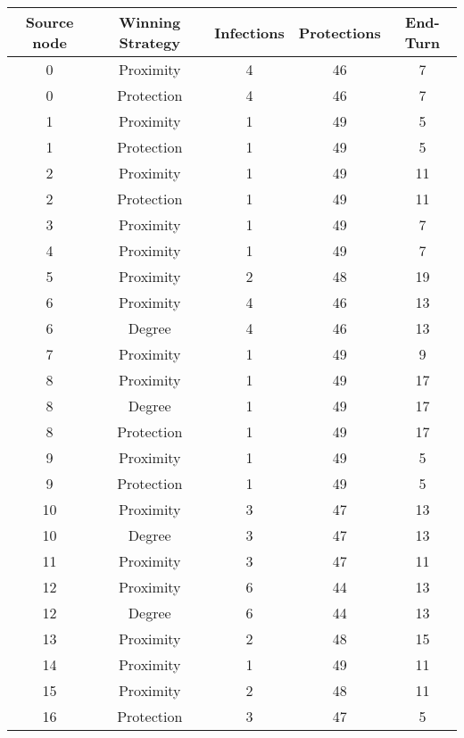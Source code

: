 \documentclass[results.tex]{subfiles}
\begin{document}
\begin{center}
  \begin{tabular}{| c || c | c | c | c |}
    \hline
    {\bfseries Source node} & {\bfseries Winning Strategy} & {\bfseries Infections} & {\bfseries Protections} & {\bfseries End-Turn} \\  %
    \hline\hline
    0 & Proximity & 4 & 46 & 7 \\ 
    \hline
    0 & Protection & 4 & 46 & 7 \\ 
    \hline
    1 & Proximity & 1 & 49 & 5 \\ 
    \hline
    1 & Protection & 1 & 49 & 5 \\ 
    \hline
    2 & Proximity & 1 & 49 & 11 \\ 
    \hline
    2 & Protection & 1 & 49 & 11 \\ 
    \hline
    3 & Proximity & 1 & 49 & 7 \\ 
    \hline
    4 & Proximity & 1 & 49 & 7 \\ 
    \hline
    5 & Proximity & 2 & 48 & 19 \\ 
    \hline
    6 & Proximity & 4 & 46 & 13 \\ 
    \hline
    6 & Degree & 4 & 46 & 13 \\ 
    \hline
    7 & Proximity & 1 & 49 & 9 \\ 
    \hline
    8 & Proximity & 1 & 49 & 17 \\ 
    \hline
    8 & Degree & 1 & 49 & 17 \\ 
    \hline
    8 & Protection & 1 & 49 & 17 \\ 
    \hline
    9 & Proximity & 1 & 49 & 5 \\ 
    \hline
    9 & Protection & 1 & 49 & 5 \\ 
    \hline
    10 & Proximity & 3 & 47 & 13 \\ 
    \hline
    10 & Degree & 3 & 47 & 13 \\ 
    \hline
    11 & Proximity & 3 & 47 & 11 \\ 
    \hline
    12 & Proximity & 6 & 44 & 13 \\ 
    \hline
    12 & Degree & 6 & 44 & 13 \\ 
    \hline
    13 & Proximity & 2 & 48 & 15 \\ 
    \hline
    14 & Proximity & 1 & 49 & 11 \\ 
    \hline
    15 & Proximity & 2 & 48 & 11 \\ 
    \hline
    16 & Protection & 3 & 47 & 5 \\ 
    \hline

\end{tabular}
\end{center}
\end{document}
